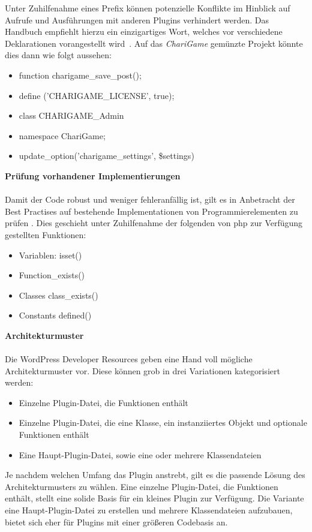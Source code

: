 Unter Zuhilfenahme eines Prefix können potenzielle Konflikte im Hinblick auf Aufrufe und Ausführungen mit anderen Plugins verhindert werden.
Das Handbuch empfiehlt hierzu ein einzigartiges Wort, welches vor verschiedene Deklarationen vorangestellt wird~\cite{wordpress2024ProceduralCodingMethod}.
Auf das \textit{ChariGame} gemünzte Projekt könnte dies dann wie folgt aussehen:
\begin{itemize}
 \item function charigame\_save\_post();
 \item define ('CHARIGAME\_LICENSE', true);
 \item class CHARIGAME\_Admin{}
 \item namespace ChariGame;
 \item update\_option('charigame\_settings', \$settings)
\end{itemize}
\vspace{1em}
\textbf{Prüfung vorhandener Implementierungen}\\\\
Damit der Code robust und weniger fehleranfällig ist, gilt es in Anbetracht der Best Practises auf bestehende Implementationen von Programmierelementen zu prüfen \cite{wordpress2024CheckExisting}.
Dies geschieht unter Zuhilfenahme der folgenden von \gls{php} zur Verfügung gestellten Funktionen:
\begin{itemize}
 \item Variablen: isset()
 \item Function\_exists() %
 \item Classes class\_exists()
 \item Constants defined()
\end{itemize}
\vspace{1em}
\textbf{Architekturmuster}\\\\
Die WordPress Developer Resources geben eine Hand voll mögliche Architekturmuster vor.
Diese können grob in drei Variationen kategorisiert werden:
\begin{itemize}
 \item Einzelne Plugin-Datei, die Funktionen enthält
 \item Einzelne Plugin-Datei, die eine Klasse, ein instanziiertes Objekt und optionale Funktionen enthält
 \item Eine Haupt-Plugin-Datei, sowie eine oder mehrere Klassendateien
\end{itemize}

Je nachdem welchen Umfang das Plugin anstrebt, gilt es die passende Lösung des Architekturmusters zu wählen.
Eine einzelne Plugin-Datei, die Funktionen enthält, stellt eine solide Basis für ein kleines Plugin zur Verfügung.
Die Variante eine Haupt-Plugin-Datei zu erstellen und mehrere Klassendateien aufzubauen, bietet sich eher für Plugins mit einer größeren Codebasis an.

